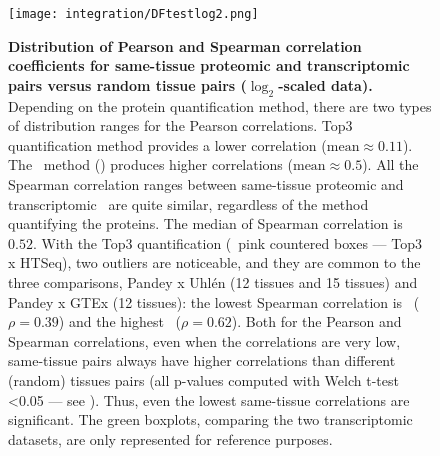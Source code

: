 \begin{figure}[!htbp]
    \texttt{[image: integration/DFtestlog2.png]}\centering
    \vspace{-4mm}
    \caption[Distribution of Pearson and Spearman correlation coefficients
    for same-tissue proteomic and transcriptomic pairs
    versus random tissue pairs]{\label{fig:TestSig}\textbf{Distribution of
    Pearson and Spearman correlation coefficients
    for same-tissue proteomic and transcriptomic pairs versus random tissue
    pairs ($\log_2$-scaled data).} Depending on the protein quantification method,
    there are two types of distribution ranges for the Pearson correlations.
    Top3 quantification method provides a lower correlation ($\text{mean} \approx 0.11$).
    The \PPKM\ method () produces higher correlations
    ($\text{mean} \approx 0.5$).
    All the Spearman correlation ranges between same-tissue proteomic and
    transcriptomic \treps\ are quite similar,
    regardless of the method quantifying the proteins.
    The median of Spearman correlation is $0.52$.
    With the Top3 quantification (\ie\ pink countered boxes --- Top3 x HTSeq),
    two outliers are noticeable, and they are common to the three comparisons,
    Pandey x Uhlén (12 tissues and 15 tissues) and Pandey x GTEx (12 tissues):
    the lowest Spearman correlation is \Oesophagus\ ($\rho=0.39$)
    and the highest \liver\ ($\rho=0.62$).
    Both for the Pearson and Spearman correlations,
    even when the correlations are very low,
    same-tissue pairs always have higher correlations than
    different (random) tissues pairs
    (all p-values computed with Welch t-test <0.05 --- see ).
    Thus, even the lowest same-tissue correlations are significant.
    The green boxplots, comparing the two transcriptomic datasets,
    are only represented for reference purposes.}
\end{figure}

